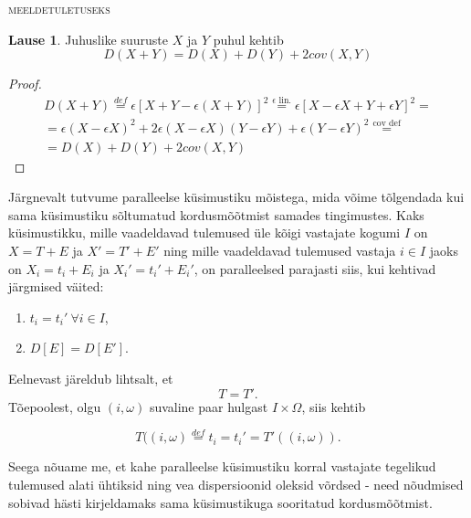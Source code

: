 \documentclass[a4paper,12pt,oneside]{article}
\newenvironment{meeldetuletus}{
	\begin{lrbox}{\thisOne}
		\begin{minipage}{0.95\textwidth} \vspace{0.25em} {\scriptsize \textsc{meeldetuletuseks}} \linebreak \vspace{-0.5em}
} 
{  
 \end{minipage}\end{lrbox}{
 		
 			\begin{mdframed}[tikzsetting={draw=black,dashed,line width=0.5pt, dash pattern = on 10pt off 3pt},%
 			linecolor=background_example,backgroundcolor=background_example,outerlinewidth=1pt]
			
 			\usebox{\thisOne}
 			\end{mdframed}
 		
 		
 	}
}
\numberwithin{equation}{section}
\theoremstyle{definition}
\newtheorem{summa_dispersioon}[equation]{Lause}
\begin{document}
\begin{meeldetuletus}
\begin{summa_dispersioon}
Juhuslike suuruste $X$ ja $Y$ puhul kehtib 
\begin{equation*}
D(X + Y) = D(X) + D(Y) + 2cov(X,Y)
\end{equation*} 
\begin{proof}
\begin{gather*}
D(X + Y) \overset{def}{=}\epsilon[X + Y - \epsilon(X + Y)]^2\overset{\text{$\epsilon$ lin.} }{=}  \epsilon [X - \epsilon X + Y + \epsilon Y]^2 = \\
 = \epsilon(X - \epsilon X)^2 + 2\epsilon (X - \epsilon X)(Y - \epsilon Y) + \epsilon (Y - \epsilon Y)^2   
 \overset{\text{cov  def}}{=}  \\   = D(X) + D(Y) + 2cov(X,Y)
\end{gather*}
\end{proof}
\end{summa_dispersioon}
\end{meeldetuletus}


{\color{green}
Järgnevalt tutvume paralleelse küsimustiku mõistega, mida võime tõlgendada kui sama küsimustiku sõltumatud kordusmõõtmist samades tingimustes. Kaks küsimustikku, mille vaadeldavad tulemused üle kõigi vastajate kogumi $I$ on $X = T + E$ ja $X' = T' + E'$ ning mille vaadeldavad tulemused vastaja $i \in I$ jaoks on $X_i = t_i + E_i$ ja $X_i' = t_i' + E_i'$, on paralleelsed parajasti siis, kui kehtivad järgmised väited:
\begin{enumerate}
\item $t_i = t_i' ~ \forall i \in I  $,
\item $D \left[ E \right] = D \left[ E' \right] $. 
\end{enumerate}

Eelnevast järeldub lihtsalt, et  
\begin{equation}
\label{eq:true_scores_eq}
T = T' \text{.}
\end{equation} Tõepoolest, olgu $(i,\omega)$ suvaline paar hulgast $I \times \Omega$, siis kehtib

\begin{equation*}
T((i, \omega) \overset{def}{=} t_i = t_i' = T'((i,\omega)) \text{.}
\end{equation*}

Seega nõuame me, et kahe paralleelse küsimustiku korral vastajate tegelikud tulemused alati ühtiksid ning vea dispersioonid oleksid võrdsed - need nõudmised sobivad hästi kirjeldamaks sama küsimustikuga sooritatud kordusmõõtmist. }
\end{document}
